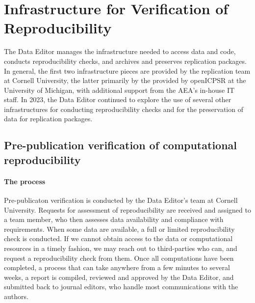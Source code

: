 
\section{Infrastructure for Verification of Reproducibility}
\label{sec:infrastructure}

The Data Editor manages the infrastructure needed to access data and code, conducts reproducibility checks, and archives and preserves replication packages. In general, the first two infrastructure pieces are provided by the replication team at Cornell University, the latter primarily by the  \aeadcr{} provided by openICPSR at the University of Michigan, with additional support from the AEA's in-house IT staff. In 2023, the Data Editor continued to explore the use of several other infrastructures for  conducting reproducibility checks and for the preservation of data for replication packages.


\subsection{Pre-publication verification of computational reproducibility}
\label{sec:verification}

\paragraph{The process}

Pre-publicaton verification is conducted by the Data Editor's team at Cornell University. 
Requests for assessment of reproducibility are received and assigned to a team member, who then assesses data availability and compliance with requirements. When some data are available, a full or limited reproducibility check is conducted. If we cannot obtain access to the data or computational resources in a timely fashion, we may reach out to third-parties who can, and request a reproducibility check from them. Once all computations have been completed, a process that can take anywhere from a few minutes to several weeks, a report is compiled, reviewed and approved by the Data Editor, and submitted back to journal editors, who handle most communications with the authors. 

